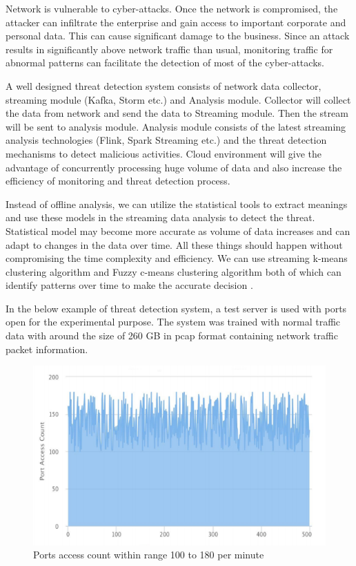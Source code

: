 \documentclass[sigconf]{acmart}
\begin{document}
Network is vulnerable to cyber-attacks. Once the network is compromised, the attacker can infiltrate the enterprise and gain access to important corporate and personal data. This can cause significant damage to the business. Since an attack results in significantly above network traffic than usual, monitoring traffic for abnormal patterns can facilitate the detection of most of the cyber-attacks.

A well designed threat detection system consists of network data collector, streaming module (Kafka, Storm etc.) and Analysis module. Collector will collect the data from network and send the data to Streaming module. Then the stream will be sent to analysis module. Analysis module consists of the latest streaming analysis technologies (Flink, Spark Streaming etc.) and the threat detection mechanisms to detect malicious activities. Cloud environment will give the advantage of concurrently processing huge volume of data and also increase the efficiency of monitoring and threat detection process.  

Instead of offline analysis, we can utilize the statistical tools to extract meanings and use these models in the streaming data analysis to detect the threat. Statistical model may become more accurate as volume of data increases and can adapt to changes in the data over time. All these things should happen without compromising the time complexity and efficiency. We can use streaming k-means clustering algorithm and Fuzzy c-means clustering algorithm both of which can identify patterns over time to make the accurate decision \cite{streaming-based-network-monitoring-and-threat-detection-system}.

In the below example of threat detection system, a test server is used with ports open for the experimental purpose. The system was trained with normal traffic data with around the size of 260 GB in pcap format containing network traffic packet information. 

\begin{figure}[htb]
  \centering
  \includegraphics[width=1.0\columnwidth]{images/Figure5.png}
  \caption{Ports access count within range 100 to 180 per minute
  \cite{streaming-based-network-monitoring-and-threat-detection-system}}
  \label{fig:Figure5} 
\end{figure}
\end{document}
